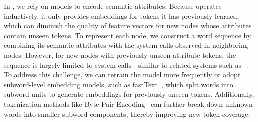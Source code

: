 
 In \Sys, we rely on \wordvec models to encode semantic attributes. Because \wordvec operates inductively, it only provides embeddings for tokens it has previously learned, which can diminish the quality of feature vectors for new nodes whose attributes contain unseen tokens. To represent each node, we construct a word sequence by combining its semantic attributes with the system calls observed in neighboring nodes. However, for new nodes with previously unseen attribute tokens, the sequence is largely limited to system calls—similar to related systems such as \threatrace~\cite{wang2022threatrace}. To address this challenge, we can retrain the \wordvec model more frequently or adopt subword-level embedding models, such as fastText~\cite{joulin2016bag}, which split words into subword units to generate embeddings for previously unseen tokens. Additionally, tokenization methods like Byte-Pair Encoding~\cite{araabi2022effective} can further break down unknown words into smaller subword components, thereby improving new token coverage.




